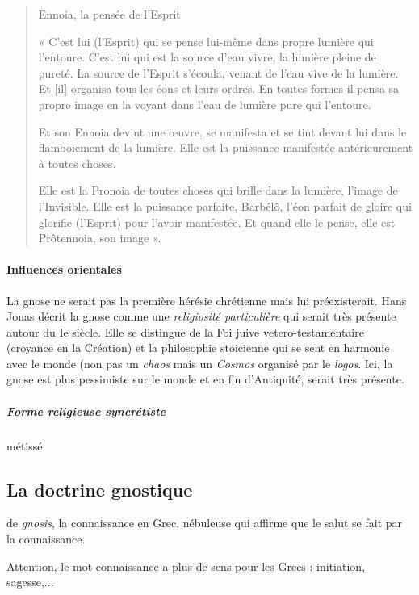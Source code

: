        \begin{quote}
        
 


Ennoia, la pensée de l'Esprit

« C'est lui (l'Esprit) qui se pense lui-même dans propre lumière qui
l'entoure. C'est lui qui est la source d'eau vivre, la lumière pleine de
pureté. La source de l'Esprit s'écoula, venant de l'eau vive de la
lumière. Et {[}il{]} organisa tous les éons et leurs ordres. En toutes
formes il pensa sa propre image en la voyant dans l'eau de lumière pure
qui l'entoure.

Et son Ennoia devint une œuvre, se manifesta et se tint devant lui dans
le flamboiement de la lumière. Elle est la puissance manifestée
antérieurement à toutes choses.

Elle est la Pronoia de toutes choses qui brille dans la lumière, l'image
de l'Invisible. Elle est la puissance parfaite, Barbélô, l'éon parfait
de gloire qui glorifie (l'Esprit) pour l'avoir manifestée. Et quand elle
le pense, elle est Prôtennoia, son image ».



    \end{quote}
   \paragraph{Influences orientales} La gnose ne serait pas la première hérésie chrétienne mais lui préexisterait. Hans Jonas décrit la gnose comme une \textit{religiosité particulière} qui serait très présente autour du Ie siècle. Elle se distingue de la Foi juive vetero-testamentaire (croyance en la Création) et la philosophie stoicienne qui se sent en harmonie avec le monde (non pas un \emph{chaos} mais un \emph{Cosmos} organisé par le \emph{logos}. Ici, la gnose est plus pessimiste sur le monde et en fin d'Antiquité, serait très présente.
   
   \subparagraph{Forme religieuse syncrétiste} métissé.
   
    
    \subsection{La doctrine gnostique}
    
    \begin{Def}[Gnose]
    de \emph{gnosis}, la connaissance en Grec, nébuleuse qui affirme que le salut se fait par la connaissance.
    \end{Def}
    Attention, le mot connaissance a plus de sens pour les Grecs : initiation, sagesse,...

